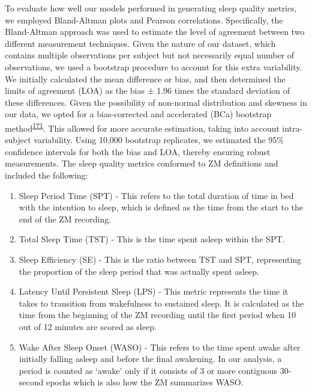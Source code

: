 \documentclass[
  10pt,
]{scrbook}
\providecommand{\tightlist}{%
  \setlength{\itemsep}{0pt}\setlength{\parskip}{0pt}}\usepackage{longtable,booktabs,array}
\begin{document}
To evaluate how well our models performed in generating sleep quality
metrics, we employed Bland-Altman plots and Pearson correlations.
Specifically, the Bland-Altman approach was used to estimate the level
of agreement between two different measurement techniques. Given the
nature of our dataset, which contains multiple observations per subject
but not necessarily equal number of observations, we used a bootstrap
procedure to account for this extra variability. We initially calculated
the mean difference or bias, and then determined the limits of agreement
(LOA) as the bias ± 1.96 times the standard deviation of these
differences. Given the possibility of non-normal distribution and
skewness in our data, we opted for a bias-corrected and accelerated
(BCa) bootstrap
method\textsuperscript{\protect\hyperlink{ref-diciccio_bootstrap_1996}{171}}.
This allowed for more accurate estimation, taking into account
intra-subject variability. Using 10,000 bootstrap replicates, we
estimated the 95\% confidence intervals for both the bias and LOA,
thereby ensuring robust measurements. The sleep quality metrics
conformed to ZM definitions and included the following:

\begin{enumerate}
\def\labelenumi{\arabic{enumi}.}
\tightlist
\item
  Sleep Period Time (SPT) - This refers to the total duration of time in
  bed with the intention to sleep, which is defined as the time from the
  start to the end of the ZM recording.
\item
  Total Sleep Time (TST) - This is the time spent asleep within the SPT.
\item
  Sleep Efficiency (SE) - This is the ratio between TST and SPT,
  representing the proportion of the sleep period that was actually
  spent asleep.
\item
  Latency Until Persistent Sleep (LPS) - This metric represents the time
  it takes to transition from wakefulness to sustained sleep. It is
  calculated as the time from the beginning of the ZM recording until
  the first period when 10 out of 12 minutes are scored as sleep.
\item
  Wake After Sleep Onset (WASO) - This refers to the time spent awake
  after initially falling asleep and before the final awakening. In our
  analysis, a period is counted as `awake' only if it consists of 3 or
  more contiguous 30-second epochs which is also how the ZM summarizes
  WASO.
\end{enumerate}
\end{document}
